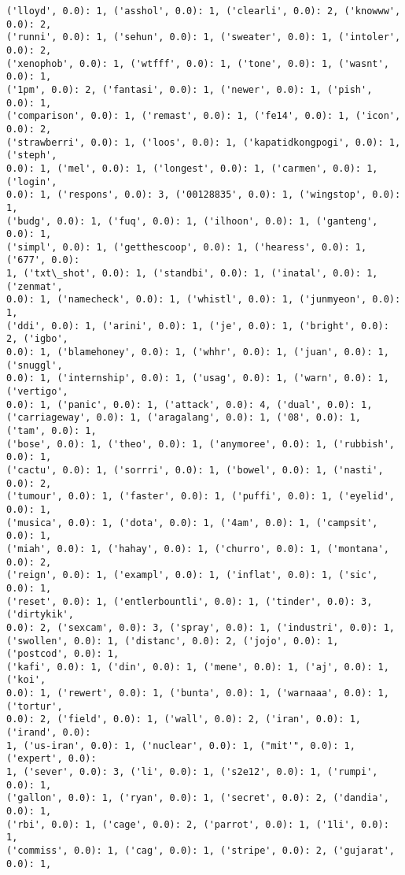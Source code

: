 \documentclass[11pt]{article}
\begin{document}
\begin{Verbatim}[commandchars=\\\{\}]
('lloyd', 0.0): 1, ('asshol', 0.0): 1, ('clearli', 0.0): 2, ('knowww', 0.0): 2,
('runni', 0.0): 1, ('sehun', 0.0): 1, ('sweater', 0.0): 1, ('intoler', 0.0): 2,
('xenophob', 0.0): 1, ('wtfff', 0.0): 1, ('tone', 0.0): 1, ('wasnt', 0.0): 1,
('1pm', 0.0): 2, ('fantasi', 0.0): 1, ('newer', 0.0): 1, ('pish', 0.0): 1,
('comparison', 0.0): 1, ('remast', 0.0): 1, ('fe14', 0.0): 1, ('icon', 0.0): 2,
('strawberri', 0.0): 1, ('loos', 0.0): 1, ('kapatidkongpogi', 0.0): 1, ('steph',
0.0): 1, ('mel', 0.0): 1, ('longest', 0.0): 1, ('carmen', 0.0): 1, ('login',
0.0): 1, ('respons', 0.0): 3, ('00128835', 0.0): 1, ('wingstop', 0.0): 1,
('budg', 0.0): 1, ('fuq', 0.0): 1, ('ilhoon', 0.0): 1, ('ganteng', 0.0): 1,
('simpl', 0.0): 1, ('getthescoop', 0.0): 1, ('hearess', 0.0): 1, ('677', 0.0):
1, ('txt\_shot', 0.0): 1, ('standbi', 0.0): 1, ('inatal', 0.0): 1, ('zenmat',
0.0): 1, ('namecheck', 0.0): 1, ('whistl', 0.0): 1, ('junmyeon', 0.0): 1,
('ddi', 0.0): 1, ('arini', 0.0): 1, ('je', 0.0): 1, ('bright', 0.0): 2, ('igbo',
0.0): 1, ('blamehoney', 0.0): 1, ('whhr', 0.0): 1, ('juan', 0.0): 1, ('snuggl',
0.0): 1, ('internship', 0.0): 1, ('usag', 0.0): 1, ('warn', 0.0): 1, ('vertigo',
0.0): 1, ('panic', 0.0): 1, ('attack', 0.0): 4, ('dual', 0.0): 1,
('carriageway', 0.0): 1, ('aragalang', 0.0): 1, ('08', 0.0): 1, ('tam', 0.0): 1,
('bose', 0.0): 1, ('theo', 0.0): 1, ('anymoree', 0.0): 1, ('rubbish', 0.0): 1,
('cactu', 0.0): 1, ('sorrri', 0.0): 1, ('bowel', 0.0): 1, ('nasti', 0.0): 2,
('tumour', 0.0): 1, ('faster', 0.0): 1, ('puffi', 0.0): 1, ('eyelid', 0.0): 1,
('musica', 0.0): 1, ('dota', 0.0): 1, ('4am', 0.0): 1, ('campsit', 0.0): 1,
('miah', 0.0): 1, ('hahay', 0.0): 1, ('churro', 0.0): 1, ('montana', 0.0): 2,
('reign', 0.0): 1, ('exampl', 0.0): 1, ('inflat', 0.0): 1, ('sic', 0.0): 1,
('reset', 0.0): 1, ('entlerbountli', 0.0): 1, ('tinder', 0.0): 3, ('dirtykik',
0.0): 2, ('sexcam', 0.0): 3, ('spray', 0.0): 1, ('industri', 0.0): 1,
('swollen', 0.0): 1, ('distanc', 0.0): 2, ('jojo', 0.0): 1, ('postcod', 0.0): 1,
('kafi', 0.0): 1, ('din', 0.0): 1, ('mene', 0.0): 1, ('aj', 0.0): 1, ('koi',
0.0): 1, ('rewert', 0.0): 1, ('bunta', 0.0): 1, ('warnaaa', 0.0): 1, ('tortur',
0.0): 2, ('field', 0.0): 1, ('wall', 0.0): 2, ('iran', 0.0): 1, ('irand', 0.0):
1, ('us-iran', 0.0): 1, ('nuclear', 0.0): 1, ("mit'", 0.0): 1, ('expert', 0.0):
1, ('sever', 0.0): 3, ('li', 0.0): 1, ('s2e12', 0.0): 1, ('rumpi', 0.0): 1,
('gallon', 0.0): 1, ('ryan', 0.0): 1, ('secret', 0.0): 2, ('dandia', 0.0): 1,
('rbi', 0.0): 1, ('cage', 0.0): 2, ('parrot', 0.0): 1, ('1li', 0.0): 1,
('commiss', 0.0): 1, ('cag', 0.0): 1, ('stripe', 0.0): 2, ('gujarat', 0.0): 1,

\end{Verbatim}
\end{document}
